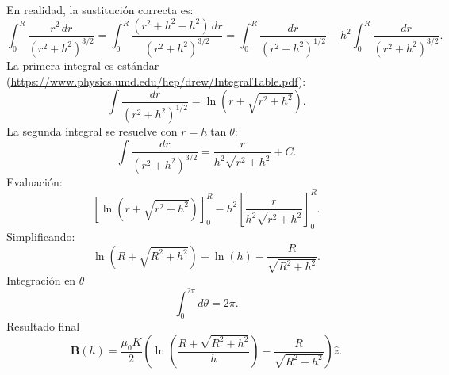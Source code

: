 \documentclass[11pt]{book}
\theoremstyle{definicion}
\theoremstyle{teorema}
\theoremstyle{ejemplo}
\begin{document}
\noindent En realidad, la sustitución correcta es:
   \[
   \int_{0}^{R} \frac{r^2 \, dr}{(r^2 + h^2)^{3/2}} = \int_{0}^{R} \frac{(r^2 + h^2 - h^2) \, dr}{(r^2 + h^2)^{3/2}} = \int_{0}^{R} \frac{dr}{(r^2 + h^2)^{1/2}} - h^2 \int_{0}^{R} \frac{dr}{(r^2 + h^2)^{3/2}}.
   \]
%
La primera integral es estándar (\url{https://www.physics.umd.edu/hep/drew/IntegralTable.pdf}):
     \[
     \int \frac{dr}{(r^2 + h^2)^{1/2}} = \ln\left(r + \sqrt{r^2 + h^2}\right).
     \]
%
%
%
%
%
%
%
%
%    
%     
La segunda integral se resuelve con \( r = h \tan \theta \):
     \[
     \int \frac{dr}{(r^2 + h^2)^{3/2}} = \frac{r}{h^2 \sqrt{r^2 + h^2}} + C.
     \]
%
%
%
%
%
%
%
%
%
%    
%
Evaluación:
   \[
   \left[ \ln\left(r + \sqrt{r^2 + h^2}\right) \right]_{0}^{R} - h^2 \left[ \frac{r}{h^2 \sqrt{r^2 + h^2}} \right]_{0}^{R}.
   \]
   Simplificando:
   \[
   \ln\left(R + \sqrt{R^2 + h^2}\right) - \ln(h) - \frac{R}{\sqrt{R^2 + h^2}}.
   \]
Integración en \( \theta \)
\[
\int_{0}^{2\pi} d\theta = 2\pi.
\]
Resultado final
\[
\mathbf{B}(h) = \frac{\mu_0 K}{2} \left( \ln\left(\frac{R + \sqrt{R^2 + h^2}}{h}\right) - \frac{R}{\sqrt{R^2 + h^2}} \right) \hat{z}.
\]
\end{document}
